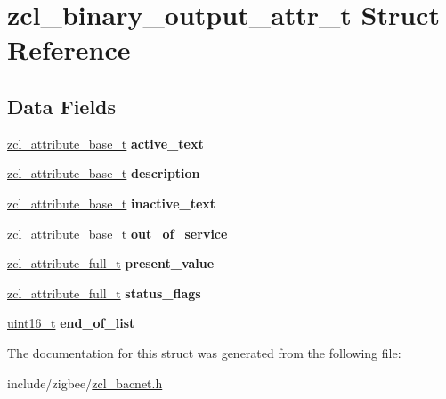 \hypertarget{structzcl__binary__output__attr__t}{\section{zcl\-\_\-binary\-\_\-output\-\_\-attr\-\_\-t Struct Reference}
\label{structzcl__binary__output__attr__t}
}
\subsection*{Data Fields}
\begin{DoxyCompactItemize}
\item 
\hypertarget{structzcl__binary__output__attr__t_a553fa88586bb1363dab7de87542fc2eb}{\hyperlink{structzcl__attribute__base__t}{zcl\-\_\-attribute\-\_\-base\-\_\-t} {\bfseries active\-\_\-text}}\label{structzcl__binary__output__attr__t_a553fa88586bb1363dab7de87542fc2eb}

\item 
\hypertarget{structzcl__binary__output__attr__t_a182d10de1c0759d95a8a660af1cc8680}{\hyperlink{structzcl__attribute__base__t}{zcl\-\_\-attribute\-\_\-base\-\_\-t} {\bfseries description}}\label{structzcl__binary__output__attr__t_a182d10de1c0759d95a8a660af1cc8680}

\item 
\hypertarget{structzcl__binary__output__attr__t_a98d315857b484ac9b45c0d63a2ad3f3f}{\hyperlink{structzcl__attribute__base__t}{zcl\-\_\-attribute\-\_\-base\-\_\-t} {\bfseries inactive\-\_\-text}}\label{structzcl__binary__output__attr__t_a98d315857b484ac9b45c0d63a2ad3f3f}

\item 
\hypertarget{structzcl__binary__output__attr__t_a5973642ae212fd359977211923a6875b}{\hyperlink{structzcl__attribute__base__t}{zcl\-\_\-attribute\-\_\-base\-\_\-t} {\bfseries out\-\_\-of\-\_\-service}}\label{structzcl__binary__output__attr__t_a5973642ae212fd359977211923a6875b}

\item 
\hypertarget{structzcl__binary__output__attr__t_a4b3f698bcaa87726019c831614021664}{\hyperlink{structzcl__attribute__full__t}{zcl\-\_\-attribute\-\_\-full\-\_\-t} {\bfseries present\-\_\-value}}\label{structzcl__binary__output__attr__t_a4b3f698bcaa87726019c831614021664}

\item 
\hypertarget{structzcl__binary__output__attr__t_a231d8fff6a85e7824504bfd8d83de174}{\hyperlink{structzcl__attribute__full__t}{zcl\-\_\-attribute\-\_\-full\-\_\-t} {\bfseries status\-\_\-flags}}\label{structzcl__binary__output__attr__t_a231d8fff6a85e7824504bfd8d83de174}

\item 
\hypertarget{structzcl__binary__output__attr__t_a2066d4a3853d4b0d8de8b162f829e10f}{\hyperlink{group__hal_ga5a8b2dc9e45a9ee81a94ef304fb62505}{uint16\-\_\-t} {\bfseries end\-\_\-of\-\_\-list}}\label{structzcl__binary__output__attr__t_a2066d4a3853d4b0d8de8b162f829e10f}

\end{DoxyCompactItemize}


The documentation for this struct was generated from the following file\-:\begin{DoxyCompactItemize}
\item 
include/zigbee/\hyperlink{zcl__bacnet_8h}{zcl\-\_\-bacnet.\-h}\end{DoxyCompactItemize}

